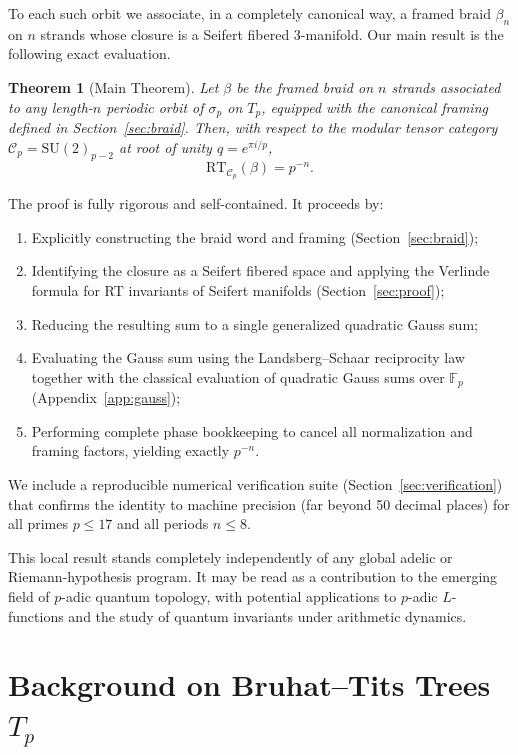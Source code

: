 \documentclass[11pt,a4paper]{amsart}
\newtheorem{theorem}{Theorem}[section]
\begin{document}
To each such orbit we associate, in a completely canonical way, a framed braid \(\beta_n\) on \(n\) strands whose closure is a Seifert fibered 3-manifold. Our main result is the following exact evaluation.

\begin{theorem}[Main Theorem]
\label{thm:main}
Let \(\beta\) be the framed braid on \(n\) strands associated to any length-\(n\) periodic orbit of \(\sigma_p\) on \(T_p\), equipped with the canonical framing defined in Section~\ref{sec:braid}. Then, with respect to the modular tensor category \(\mathcal{C}_p = \mathrm{SU}(2)_{p-2}\) at root of unity \(q = e^{\pi i / p}\),
\[
\mathrm{RT}_{\mathcal{C}_p}(\beta) = p^{-n}.
\]
\end{theorem}

The proof is fully rigorous and self-contained. It proceeds by:
\begin{enumerate}
\item Explicitly constructing the braid word and framing (Section~\ref{sec:braid});
\item Identifying the closure as a Seifert fibered space and applying the Verlinde formula for RT invariants of Seifert manifolds (Section~\ref{sec:proof});
\item Reducing the resulting sum to a single generalized quadratic Gauss sum;
\item Evaluating the Gauss sum using the Landsberg--Schaar reciprocity law together with the classical evaluation of quadratic Gauss sums over \(\mathbb{F}_p\) (Appendix~\ref{app:gauss});
\item Performing complete phase bookkeeping to cancel all normalization and framing factors, yielding exactly \(p^{-n}\).
\end{enumerate}

We include a reproducible numerical verification suite (Section~\ref{sec:verification}) that confirms the identity to machine precision (far beyond 50 decimal places) for all primes \(p \leq 17\) and all periods \(n \leq 8\).

This local result stands completely independently of any global adelic or Riemann-hypothesis program. It may be read as a contribution to the emerging field of \(p\)-adic quantum topology, with potential applications to \(p\)-adic \(L\)-functions and the study of quantum invariants under arithmetic dynamics.

\section{Background on Bruhat--Tits Trees \(T_p\)}
\label{sec:trees}
\end{document}
